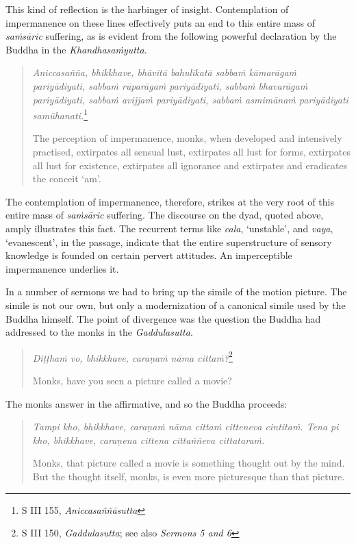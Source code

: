 This kind of reflection is the harbinger of insight. Contemplation of impermanence on these lines effectively puts an end to this entire mass of \emph{saṁsāric} suffering, as is evident from the following powerful declaration by the Buddha in the \emph{Khandhasaṁyutta}.

\begin{quote}
\emph{Aniccasañña, bhikkhave, bhāvitā bahulīkatā sabbaṁ kāmarāgaṁ pariyādiyati, sabbaṁ rūparāgaṁ pariyādiyati, sabbaṁ bhavarāgaṁ pariyādiyati, sabbaṁ avijjaṁ pariyādiyati, sabbaṁ asmimānaṁ pariyādiyati samūhanati.}\footnote{S III 155, \emph{Aniccasaññāsutta}}

The perception of impermanence, monks, when developed and intensively practised, extirpates all sensual lust, extirpates all lust for forms, extirpates all lust for existence, extirpates all ignorance and extirpates and eradicates the conceit `am'.
\end{quote}

The contemplation of impermanence, therefore, strikes at the very root of this entire mass of \emph{saṁsāric} suffering. The discourse on the dyad, quoted above, amply illustrates this fact. The recurrent terms like \emph{cala}, `unstable', and \emph{vaya}, `evanescent', in the passage, indicate that the entire superstructure of sensory knowledge is founded on certain pervert attitudes. An imperceptible impermanence underlies it.

In a number of sermons we had to bring up the simile of the motion picture. The simile is not our own, but only a modernization of a canonical simile used by the Buddha himself. The point of divergence was the question the Buddha had addressed to the monks in the \emph{Gaddulasutta}.

\begin{quote}
\emph{Diṭṭhaṁ vo, bhikkhave, caraṇaṁ nāma cittaṁ?}\footnote{S III 150, \emph{Gaddulasutta}; see also \emph{Sermons 5 and 6}}

Monks, have you seen a picture called a movie?
\end{quote}

The monks answer in the affirmative, and so the Buddha proceeds:

\begin{quote}
\emph{Tampi kho, bhikkhave, caraṇaṁ nāma cittaṁ citteneva cintitaṁ. Tena pi kho, bhikkhave, caraṇena cittena cittaññeva cittataraṁ.}

Monks, that picture called a movie is something thought out by the mind. But the thought itself, monks, is even more picturesque than that picture.
\end{quote}

